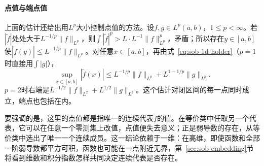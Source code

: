 \paragraph{点值与端点值}
上面的估计还给出用$L^p$大小控制点值的方法。设$f,g\in L^p(a,b)$，$1\le p<\infty$。若$|\tilde f|$处处大于$L^{-1/p}\|f\|_{L^p}$，则$\int|\tilde f|^p>L\cdot L^{-1}\|f\|_{L^p}^p$，矛盾；所以存在$y\in[a,b]$使$|\tilde f(y)|\le L^{-1/p}\|f\|_{L^p}$。对任意$x\in[a,b]$，再由式~\eqref{eq:sob-1d-holder}（$p=1$时直接用$\int|g|$），
\begin{equation}
 \sup_{x\in[a,b]}|\tilde f(x)|\le L^{-1/p}\|f\|_{L^p}+L^{1-1/p}\|g\|_{L^p} .
 \label{eq:sob-1d-sup-bound}
\end{equation}
$p=2$时右端是$L^{-1/2}\|f\|_{L^2}+L^{1/2}\|g\|_{L^2}$。这个估计对闭区间的每一点同时成立，端点也包括在内。

要强调的是，这里的点值都是指唯一的连续代表$\tilde f$的值。在等价类中任取另一个代表，它可以在任意一个零测集上改值，点值便失去意义；正是弱导数的存在，从等价类中选出了唯一一个连续成员。这一结论依赖于一维：在高维，即使函数和全部一阶弱导数都平方可积，函数也可能在一点附近无界，第~\ref{sec:sob-embedding}节将看到维数和积分指数怎样共同决定连续代表是否存在。

